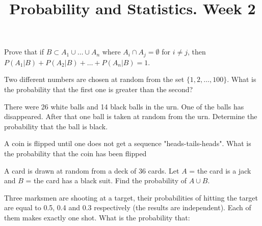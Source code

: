 \documentclass[14pt]{exam}
\title{Probability and Statistics. Week 2}
\date{}
\begin{document}
	\maketitle
	
	
	\begin{questions}
		\question
		Prove that if $B \subset A_1 \cup \dots \cup A_n$ where $A_i \cap A_j = \emptyset$ for $i\neq j$, then $P(A_1|B) + P(A_2|B) + \dots + P(A_n|B) = 1$.
		
		
		
		 
		\question
		Two different numbers are chosen at random from the set $\{1, 2, \dots, 100\}$. What is the probability that the first one is greater than the second?
		
		
		
		
		
		\question
		There were 26 white balls and 14 black balls in the urn. One of the balls has disappeared. After that one ball is taken at random from the urn. Determine the probability that the ball is black.
		



		
		\question
		A coin is flipped until one does not get a sequence "heads-tails-heads". What is the probability that the coin has been flipped
		
		




		
		\question
		A card is drawn at random from a deck of 36 cards. Let $A$ = {the card is a jack} and $B$ = {the card has a black suit}. Find the probability of $A \cup B$.
		





		
		\question
		Three marksmen are shooting at a target, their probabilities of hitting the target are equal to 0.5, 0.4 and 0.3 respectively (the results are independent). Each of them makes exactly one shot. What is the probability that:
		\begin{parts}

\end{parts}
\end{questions}
\end{document}
